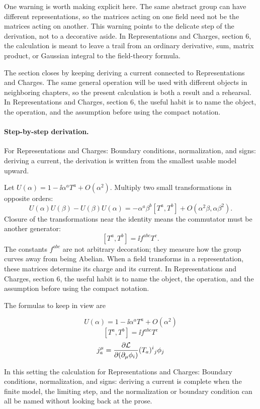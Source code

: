 One warning is worth making explicit here.  The same abstract group can have different representations, so the matrices acting on one field need not be the matrices acting on another.  This warning points to the delicate step of the derivation, not to a decorative aside.  In Representations and Charges, section 6, the calculation is meant to leave a trail from an ordinary derivative, sum, matrix product, or Gaussian integral to the field-theory formula.

The section closes by keeping deriving a current connected to Representations and Charges.  The same general operation will be used with different objects in neighboring chapters, so the present calculation is both a result and a rehearsal.  In Representations and Charges, section 6, the useful habit is to name the object, the operation, and the assumption before using the compact notation.



\paragraph{Step-by-step derivation.}

For Representations and Charges: Boundary conditions, normalization, and signs: deriving a current, the derivation is written from the smallest usable model upward.

Let \(U(\alpha)=1-\ii\alpha^aT^a+O(\alpha^2)\).  Multiply two small transformations in opposite orders:
\[
  U(\alpha)U(\beta)-U(\beta)U(\alpha)
  =
  -\alpha^a\beta^b[T^a,T^b]+O(\alpha^2\beta,\alpha\beta^2).
\]
Closure of the transformations near the identity means the commutator must be another generator:
\[
  [T^a,T^b]=\ii f^{abc}T^c.
\]
The constants \(f^{abc}\) are not arbitrary decoration; they measure how the group curves away from being Abelian.  When a field transforms in a representation, these matrices determine its charge and its current.  In Representations and Charges, section 6, the useful habit is to name the object, the operation, and the assumption before using the compact notation.

The formulas to keep in view are

\[
  U(\alpha)=1-\ii\alpha^aT^a+O(\alpha^2)
\]
\[
  [T^a,T^b]=\ii f^{abc}T^c
\]
\[
  j^\mu_a=\frac{\partial\mathcal L}{\partial(\partial_\mu\phi_i)}(T_a)^i{}_j\phi_j
\]

In this setting the calculation for Representations and Charges: Boundary conditions, normalization, and signs: deriving a current is complete when the finite model, the limiting step, and the normalization or boundary condition can all be named without looking back at the prose.




